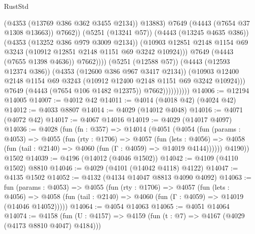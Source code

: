 \begin{lexlean}{RustStd}
\begin{coremodule}
                                          (@4353 (@13769 @386 @362 @3455 @2134))
                                          @13883)
                                        @7649
                                        (@4443 (@7654 @37 @1308 @13663))
                                        @7662))
                                    (@5251 (@13241 @57))
                                    (@4443 (@13245 @4635 @386))
                                    (@4353 (@13252 @386 @979 @3009 @2134))
                                    (@10903
                                      @12851
                                      @2148
                                      @1154
                                      @69
                                      @3243
                                      (@10912 @12851 @2148 @1151 @69 @3242 @10924)))
                                  @7649
                                  (@4443 (@7655 @1398 @4636))
                                  @7662))))
                          (@5251 (@12588 @57))
                          (@4443 (@12593 @12374 @386))
                          (@4353 (@12600 @386 @967 @3417 @2134))
                          (@10903
                            @12400
                            @2148
                            @1154
                            @69
                            @3243
                            (@10912 @12400 @2148 @1151 @69 @3242 @10924)))
                        @7649
                        (@4443 (@7654 @106 @1482 @12375))
                        @7662))))))))))
@14006 := @12194 @14005
@14007 := @4012 @42
@14011 := @4014 (@4018 @42) (@4024 @42)
@14012 := @4033 @8807
@14014 := @4029 (@14012 @4048)
@14016 := @4071 (@4072 @42)
@14017 := @4067 @14016
@14019 := @4029 (@14017 @4097)
@14036 := @4028
    (fun (fn : @357) =>
    @14014
      (@4051
        (@4054
          (fun (params : @4053) =>
          @4055
            (fun (rty : @1706) =>
            @4057
              (fun (lets : @4056) =>
              @4058 (fun (tail : @2140) => @4060 (fun (Γ : @4059) => @14019 @4144))))))
        @4190))
    @1502
@14039 := @4196 (@14012 (@4046 @1502))
@14042 := @4109 (@4110 @1502) @8810
@14046 := @4029 (@4101 (@14042 @4118) @4122)
@14047 := @4135 @1502
@14052 := @4132 (@4134 @14047 @8813 @4090 @4092)
@14063 := fun (params : @4053) =>
  @4055
    (fun (rty : @1706) =>
    @4057
      (fun (lets : @4056) =>
      @4058 (fun (tail : @2140) => @4060 (fun (Γ : @4059) => @14019 (@14046 @14052)))))
@14064 := @4054 @14063
@14065 := @4051 @14064
@14074 := @4158 (fun (U : @4157) => @4159 (fun (t : @7) => @4167 (@4029 (@4173 @8810 @4047) @4184)))

\end{coremodule}
\end{lexlean}
